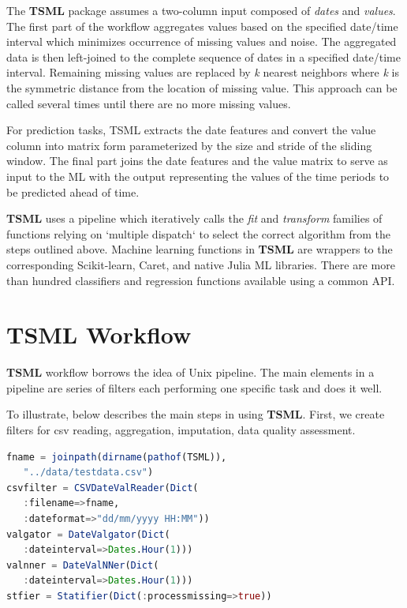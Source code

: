 \documentclass{juliacon}
\begin{document}
The \textbf{TSML} package assumes a two-column input composed of \emph{dates} and \emph{values}. 
The first part of the workflow aggregates values based on the specified date/time 
interval which minimizes occurrence of missing values and noise. The aggregated 
data is then left-joined to the complete sequence of dates in a specified date/time interval. 
Remaining missing values are replaced by \textit{k} nearest neighbors where \textit{k} is the symmetric 
distance from the location of missing value. This approach can be called several 
times until there are no more missing values.

For prediction tasks, TSML extracts the date features and 
convert the value column into matrix form parameterized by 
the size and stride of the sliding window. The final part joins
 the date features and the value matrix to serve as input to the 
 ML with the output representing the values of the time periods 
 to be predicted ahead of time.
 
\textbf{TSML} uses a pipeline which iteratively calls the \emph{fit} and \emph{transform}
families of functions relying on `multiple dispatch` to select the correct 
algorithm from the steps outlined above. Machine learning functions in 
\textbf{TSML} are wrappers to the corresponding Scikit-learn, Caret, and native Julia ML libraries. 
There are more than hundred classifiers and regression functions available using a common API.

\section{TSML Workflow}
\label{sec:tsmlworkflow}
%

\textbf{TSML} workflow borrows the idea of Unix pipeline.
The main elements in a pipeline are series of filters
each performing one specific task and does it well. 

\vskip 6pt
To illustrate, below describes the main steps in using \textbf{TSML}.
First, we create filters for csv reading, aggregation, imputation, data quality
assessment.

\begin{lstlisting}[language = Julia]
fname = joinpath(dirname(pathof(TSML)),
   "../data/testdata.csv")
csvfilter = CSVDateValReader(Dict(
   :filename=>fname,
   :dateformat=>"dd/mm/yyyy HH:MM"))
valgator = DateValgator(Dict(
   :dateinterval=>Dates.Hour(1)))
valnner = DateValNNer(Dict(
   :dateinterval=>Dates.Hour(1)))
stfier = Statifier(Dict(:processmissing=>true))
\end{lstlisting}
\end{document}
